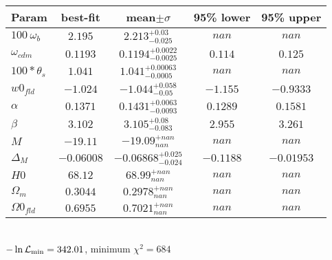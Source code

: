\begin{tabular}{|l|c|c|c|c|} 
 \hline 
Param & best-fit & mean$\pm\sigma$ & 95\% lower & 95\% upper \\ \hline 
$100~\omega_{b }$ &$2.195$ & $2.213_{-0.025}^{+0.03}$ & $nan$ & $nan$ \\ 
$\omega_{cdm }$ &$0.1193$ & $0.1194_{-0.0025}^{+0.0022}$ & $0.114$ & $0.125$ \\ 
$100*\theta_{s }$ &$1.041$ & $1.041_{-0.0005}^{+0.00063}$ & $nan$ & $nan$ \\ 
$w0_{fld }$ &$-1.024$ & $-1.044_{-0.05}^{+0.058}$ & $-1.155$ & $-0.9333$ \\ 
$\alpha$ &$0.1371$ & $0.1431_{-0.0093}^{+0.0063}$ & $0.1289$ & $0.1581$ \\ 
$\beta$ &$3.102$ & $3.105_{-0.083}^{+0.08}$ & $2.955$ & $3.261$ \\ 
$M$ &$-19.11$ & $-19.09_{nan}^{+nan}$ & $nan$ & $nan$ \\ 
$\Delta_{M }$ &$-0.06008$ & $-0.06868_{-0.024}^{+0.025}$ & $-0.1188$ & $-0.01953$ \\ 
$H0$ &$68.12$ & $68.99_{nan}^{+nan}$ & $nan$ & $nan$ \\ 
$\Omega_{m }$ &$0.3044$ & $0.2978_{nan}^{+nan}$ & $nan$ & $nan$ \\ 
$\Omega0_{fld }$ &$0.6955$ & $0.7021_{nan}^{+nan}$ & $nan$ & $nan$ \\ 
\hline 
 \end{tabular} \\ 
$-\ln{\cal L}_\mathrm{min} =342.01$, minimum $\chi^2=684$ \\ 
